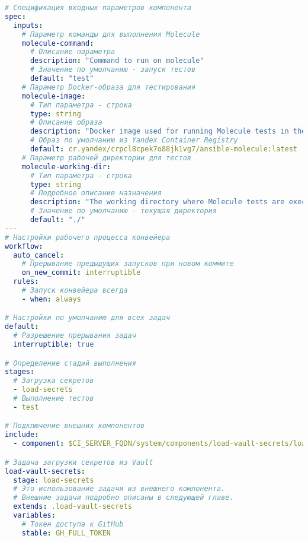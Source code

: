 \begin{lstlisting}[language=yaml,label={lst:component-pipeline}]
# Спецификация входных параметров компонента
spec:
  inputs:
    # Параметр команды для выполнения Molecule
    molecule-command:
      # Описание параметра
      description: "Command to run on molecule"
      # Значение по умолчанию - запуск тестов
      default: "test"
    # Параметр Docker-образа для тестирования
    molecule-image:
      # Тип параметра - строка
      type: string
      # Описание образа
      description: "Docker image used for running Molecule tests in the pipeline"
      # Образ по умолчанию из Yandex Container Registry
      default: cr.yandex/crpcl8cpek7o88jk1vg7/ansible-molecule:latest
    # Параметр рабочей директории для тестов
    molecule-working-dir:
      # Тип параметра - строка
      type: string
      # Подробное описание назначения
      description: "The working directory where Molecule tests are executed. This directory is set as the MOLECULE_PROJECT_DIRECTORY environment variable during the pipeline run."
      # Значение по умолчанию - текущая директория
      default: "./"
---
# Настройки рабочего процесса конвейера
workflow:
  auto_cancel:
    # Прерывание предыдущих запусков при новом коммите
    on_new_commit: interruptible
  rules:
    # Запуск конвейера всегда
    - when: always

# Настройки по умолчанию для всех задач
default:
  # Разрешение прерывания задач
  interruptible: true

# Определение стадий выполнения
stages:
  # Загрузка секретов
  - load-secrets
  # Выполнение тестов
  - test

# Подключение внешних компонентов
include:
  - component: $CI_SERVER_FQDN/system/components/load-vault-secrets/load-vault-secrets@2

# Задача загрузки секретов из Vault
load-vault-secrets:
  stage: load-secrets
  # Это использование задачи из внешнего компонента.
  # Внешние задачи подробно описаны в следующей главе.
  extends: .load-vault-secrets
  variables:
    # Токен доступа к GitHub
    stable: GH_FULL_TOKEN


\end{lstlisting}

